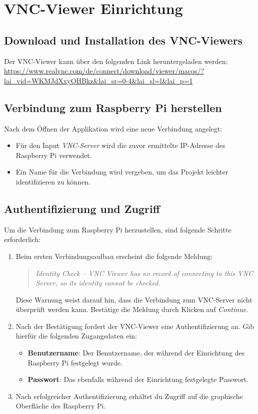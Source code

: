 \documentclass[a4paper,12pt]{article}
\begin{document}
\section{VNC-Viewer Einrichtung}
\subsection{Download und Installation des VNC-Viewers}
Der VNC-Viewer kann über den folgenden Link heruntergeladen werden:  
\url{https://www.realvnc.com/de/connect/download/viewer/macos/?lai_vid=WKMJdXxyOHBkz&lai_sr=0-4&lai_sl=l&lai_p=1}

\subsection{Verbindung zum Raspberry Pi herstellen}
Nach dem Öffnen der Applikation wird eine neue Verbindung angelegt:
\begin{itemize}
    \item Für den Input \textit{VNC-Server} wird die zuvor ermittelte IP-Adresse des Raspberry Pi verwendet.
    \item Ein Name für die Verbindung wird vergeben, um das Projekt leichter identifizieren zu können.
\end{itemize}

\subsection{Authentifizierung und Zugriff}
Um die Verbindung zum Raspberry Pi herzustellen, sind folgende Schritte erforderlich:

\begin{enumerate}
    \item Beim ersten Verbindungsaufbau erscheint die folgende Meldung:
    \begin{quote}
    \textit{Identity Check – VNC Viewer has no record of connecting to this VNC Server, so its identity cannot be checked.}
    \end{quote}
    Diese Warnung weist darauf hin, dass die Verbindung zum VNC-Server nicht überprüft werden kann. Bestätige die Meldung durch Klicken auf \textit{Continue}.
    
    \item Nach der Bestätigung fordert der VNC-Viewer eine Authentifizierung an. Gib hierfür die folgenden Zugangsdaten ein:
    \begin{itemize}
        \item \textbf{Benutzername}: Der Benutzername, der während der Einrichtung des Raspberry Pi festgelegt wurde.
        \item \textbf{Passwort}: Das ebenfalls während der Einrichtung festgelegte Passwort.
    \end{itemize}
    
    \item Nach erfolgreicher Authentifizierung erhältst du Zugriff auf die graphische Oberfläche des Raspberry Pi.
\end{enumerate}
\end{document}
